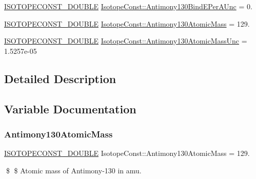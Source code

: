 \begin{DoxyCompactItemize}
\mbox{\hyperlink{group___isotope_const-_macros_ga8f45a7272ce02c0b4c65c44636ed719a}{I\+S\+O\+T\+O\+P\+E\+C\+O\+N\+S\+T\+\_\+\+D\+O\+U\+B\+LE}} \mbox{\hyperlink{group___isotope_const-_antimony-_sb130_ga3461fc03a09edc3fe77a95ccc0a5d9b6}{Isotope\+Const\+::\+Antimony130\+Bind\+E\+Per\+A\+Unc}} = 0.
\item 
\mbox{\hyperlink{group___isotope_const-_macros_ga8f45a7272ce02c0b4c65c44636ed719a}{I\+S\+O\+T\+O\+P\+E\+C\+O\+N\+S\+T\+\_\+\+D\+O\+U\+B\+LE}} \mbox{\hyperlink{group___isotope_const-_antimony-_sb130_ga27223cfd9f31f9647fe0d66e90424d18}{Isotope\+Const\+::\+Antimony130\+Atomic\+Mass}} = 129.
\item 
\mbox{\hyperlink{group___isotope_const-_macros_ga8f45a7272ce02c0b4c65c44636ed719a}{I\+S\+O\+T\+O\+P\+E\+C\+O\+N\+S\+T\+\_\+\+D\+O\+U\+B\+LE}} \mbox{\hyperlink{group___isotope_const-_antimony-_sb130_gaf5bb9fe8577fc68875c3811944e24f9d}{Isotope\+Const\+::\+Antimony130\+Atomic\+Mass\+Unc}} = 1.\+5257e-\/05
\end{DoxyCompactItemize}


\subsection{Detailed Description}


\subsection{Variable Documentation}
\mbox{\label{group___isotope_const-_antimony-_sb130_ga27223cfd9f31f9647fe0d66e90424d18}} 
\subsubsection{\texorpdfstring{Antimony130\+Atomic\+Mass}{Antimony130AtomicMass}}
{\footnotesize\ttfamily \mbox{\hyperlink{group___isotope_const-_macros_ga8f45a7272ce02c0b4c65c44636ed719a}{I\+S\+O\+T\+O\+P\+E\+C\+O\+N\+S\+T\+\_\+\+D\+O\+U\+B\+LE}} Isotope\+Const\+::\+Antimony130\+Atomic\+Mass = 129.}

\$ \$ Atomic mass of Antimony-\/130 in amu. \mbox{\label{group___isotope_const-_antimony-_sb130_gaf5bb9fe8577fc68875c3811944e24f9d}} 
